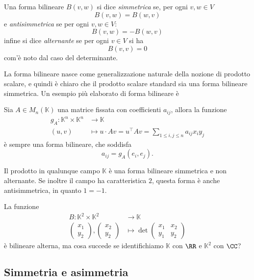 \documentclass[11pt]{scrartcl}
\newcommand{\KK}{\mathbb{K}}
\begin{document}
	\begin{definition}
		Una forma bilineare $B(v,w)$ si dice \textit{simmetrica} se, per ogni $v,w\in V$
		$$B(v,w)=B(w,v)$$
		e \textit{antisimmetrica} se per ogni $v,w\in V$:
		$$B(v,w)=-B(w,v)$$
		infine si dice \textit{alternante} se per ogni $v\in V$ si ha
		$$B(v,v)=0$$
		com'è noto dal caso del determinante.
	\end{definition}
	La forma bilineare nasce come generalizzazione naturale della nozione di prodotto scalare, e quindi è chiaro che il prodotto scalare standard sia una forma bilineare simmetrica. Un esempio più elaborato di forma bilineare è
	\begin{example}
		Sia $A\in M_n(\KK)$ una matrice fissata con coefficienti $a_{ij}$, allora la funzione
		\begin{align*}
			g_A:\KK^n\times \KK^n & \to \KK \\
			(u,v) & \mapsto u \cdot Av = u^\intercal A v=\sum_{1\le i,j \le n}a_{ij}x_iy_j
		\end{align*}
		è sempre una forma bilineare, che soddisfa 
		$$a_{ij}=g_{A}\left(e_i,e_j\right).$$
	\end{example}
	\begin{example}
		Il prodotto in qualunque campo $\KK$ è una forma bilineare simmetrica e non alternante. Se inoltre il campo ha caratteristica $2$, questa forma è anche antisimmetrica, in quanto $1=-1$.
	\end{example}
	\begin{example}[Determinante]
		La funzione
		\begin{align*}
			B:\KK^2\times \KK^2 & \to \KK \\
			\begin{pmatrix}
				x_1 \\
				y_2 
			\end{pmatrix},
			\begin{pmatrix}
				x_2 \\
				y_2
			\end{pmatrix} & \mapsto \det
			\begin{pmatrix}
				x_1 & x_2 \\
				y_1 & y_2
			\end{pmatrix}
		\end{align*}
		è bilineare alterna, ma cosa succede se identifichiamo $\KK$ con $\RR$ e $\KK^2$ con $\CC$?
	\end{example}
	
	\subsection{Simmetria e asimmetria}
	
\end{document}
